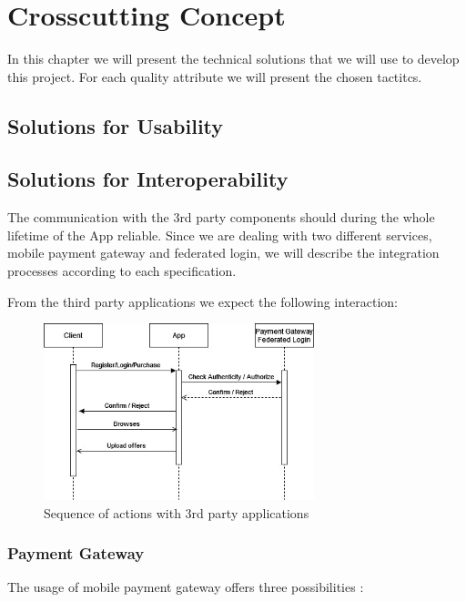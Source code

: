 \section{Crosscutting Concept}

In this chapter we will present the technical solutions that we will use to develop this project.
For each quality attribute we will present the chosen tactitcs.

\subsection{Solutions for Usability}

\subsection{Solutions for Interoperability}

The communication with the 3rd party components should during the whole lifetime of the App reliable. Since we are dealing with
two different services, \gls{mobile payment gateway} and \gls{federated login}, we will describe the integration processes 
according to each specification.

From the third party applications we expect the following interaction:

\begin{figure}[H]
    \centering
    \includegraphics[width=0.7\textwidth]{assets/sequence_login_payment.jpg}
    \caption{Sequence of actions with 3rd party applications}
    \label{fig:sequence_login_payment}
\end{figure}

\subsubsection{Payment Gateway}

The usage of \gls{mobile payment gateway} offers three possibilities \cite{refonline:ZOPG}:

